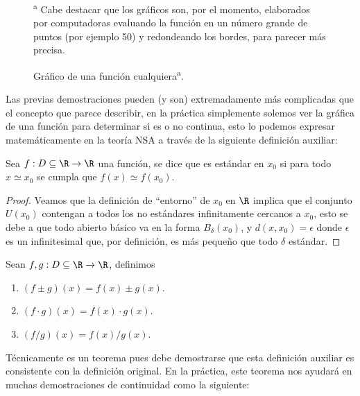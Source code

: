 \documentclass[11pt,oneside,a4paper]{book}
\begin{document}
\begin{figure}
\begin{center}
\caption{Gráfico de una función cualquiera\textsuperscript{a}.}
\end{center}
\noindent\hrulefill

\footnotesize\textsuperscript{a} Cabe destacar que los gráficos son, por el momento, elaborados por computadoras evaluando la función en un número grande de puntos (por ejemplo 50) y redondeando los bordes, para parecer más precisa.
\end{figure}
Las previas demostraciones pueden (y son) extremadamente más complicadas que el concepto que parece describir, en la práctica simplemente solemos ver la gráfica de una función para determinar si es o no continua, esto lo podemos expresar matemáticamente en la teoría NSA a través de la siguiente definición auxiliar:
\begin{thm}\label{thm:continuity-nsa}
Sea $f:D\subseteq\R\rightarrow\R$ una función, se dice que es estándar en $x_0$ si para todo $x\simeq x_0$ se cumpla que $f(x)\simeq f(x_0)$.
\end{thm}
\begin{proof}
Veamos que la definición de ``entorno'' de $x_0$ en $\R$ implica que el conjunto $U(x_0)$ contengan a todos los no estándares infinitamente cercanos a $x_0$, esto se debe a que todo abierto básico va en la forma $B_\delta(x_0)$, y $d(x,x_0)=\epsilon$ donde $\epsilon$ es un infinitesimal que, por definición, es más pequeño que todo $\delta$ estándar.
\end{proof}
\begin{mydef}
Sean $f,g:D\subseteq\R\rightarrow\R$, definimos
\begin{enumerate}[$a)$]
\item $(f\pm g)(x)=f(x)\pm g(x)$.
\item $(f\cdot g)(x)=f(x)\cdot g(x)$.
\item $(f/g)(x)=f(x)/g(x)$.
\end{enumerate}
\end{mydef}
Técnicamente es un teorema pues debe demostrarse que esta definición auxiliar es consistente con la definición original. En la práctica, este teorema nos ayudará en muchas demostraciones de continuidad como la siguiente:
\end{document}
